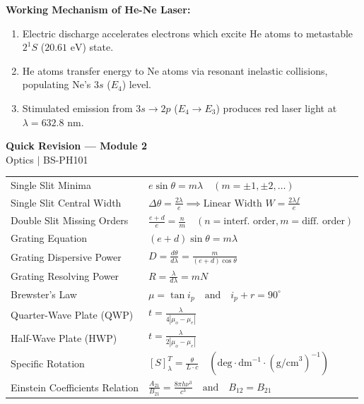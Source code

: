 \documentclass[12pt,a4paper]{article}
\renewcommand{\arraystretch}{1.45}
\begin{document}
\textbf{Working Mechanism of He-Ne Laser:}
\begin{enumerate}[leftmargin=*, itemsep=2pt]
  \item Electric discharge accelerates electrons which excite He atoms to metastable $2^1S$ ($20.61\text{ eV}$) state.
  \item He atoms transfer energy to Ne atoms via resonant inelastic collisions, populating Ne's $3s$ ($E_4$) level.
  \item Stimulated emission from $3s \to 2p$ ($E_4 \to E_3$) produces red laser light at $\lambda = 632.8\text{ nm}$.
\end{enumerate}

\newpage
\begin{center}
  {\large\bfseries\color{myred} Quick Revision --- Module 2}\\[3pt]
  {\small\color{mydark} Optics $|$ BS-PH101}
\end{center}
\noindent{\color{myred}\rule{\linewidth}{1.2pt}}
\vspace{4pt}

\begin{tcolorbox}[formulabox, title={\textbf{Key Formulas and Metrics at a Glance}}]
\renewcommand{\arraystretch}{1.35}
\begin{tabularx}{\linewidth}{B{5.0cm} X}
Single Slit Minima & $e \sin\theta = m \lambda \quad (m = \pm 1, \pm 2, \ldots)$ \\[4pt]
Single Slit Central Width & $\Delta \theta = \frac{2\lambda}{e} \implies \text{Linear Width } W = \frac{2\lambda f}{e}$ \\[4pt]
Double Slit Missing Orders & $\frac{e+d}{e} = \frac{n}{m} \quad (n = \text{interf. order}, m = \text{diff. order})$ \\[4pt]
Grating Equation & $(e+d)\sin\theta = m \lambda$ \\[4pt]
Grating Dispersive Power & $D = \frac{d\theta}{d\lambda} = \frac{m}{(e+d)\cos\theta}$ \\[4pt]
Grating Resolving Power & $R = \frac{\lambda}{d\lambda} = m N$ \\[4pt]
Brewster's Law & $\mu = \tan i_p \quad \text{and} \quad i_p + r = 90^\circ$ \\[4pt]
Quarter-Wave Plate (QWP) & $t = \frac{\lambda}{4 |\mu_o - \mu_e|}$ \\[4pt]
Half-Wave Plate (HWP) & $t = \frac{\lambda}{2 |\mu_o - \mu_e|}$ \\[4pt]
Specific Rotation & $[S]_\lambda^T = \frac{\theta}{L \cdot c} \quad (\text{deg} \cdot \text{dm}^{-1} \cdot (\text{g/cm}^3)^{-1})$ \\[4pt]
Einstein Coefficients Relation & $\frac{A_{21}}{B_{21}} = \frac{8\pi h \nu^3}{c^3} \quad \text{and} \quad B_{12} = B_{21}$ \\[4pt]
\end{tabularx}
\end{tcolorbox}
\end{document}
